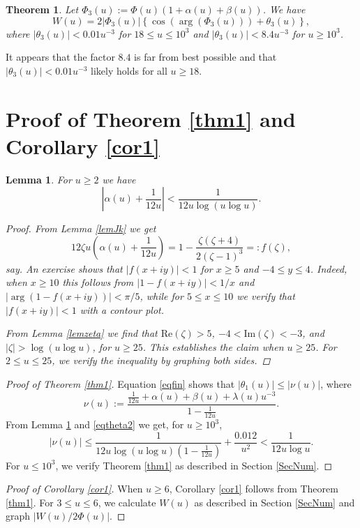 \documentclass[11pt]{amsart}
\newtheorem{theorem}{Theorem}
\newtheorem{lemma}{Lemma}
\begin{document}
\begin{theorem}\label{thm3}
Let $\Phi_3(u):=\Phi(u)(1+\alpha(u)+\beta(u))$. 
We have 
$$
W(u)=2 |\Phi_3(u)|\left\{\cos(\arg(\Phi_3(u)))+\theta_3(u)\right\},
$$
where $|\theta_3(u)|< 0.01 u^{-3}$ for $18 \le u \le 10^3$ and $|\theta_3(u)|<8.4 u^{-3}$ for $u\ge 10^3$.
\end{theorem}

It appears that the factor $8.4$ is far from best possible and that $|\theta_3(u)|< 0.01 u^{-3}$ likely holds for all $u\ge 18$. 



\section{Proof of Theorem \ref{thm1} and Corollary \ref{cor1}}



\begin{lemma}\label{lemalpha}
For $u\ge 2$ we have 
$$
\left| \alpha(u) +\frac{1}{12u}\right|< \frac{1}{12 u \log(u\log u)}.
$$
\begin{proof}
From Lemma \ref{lemJk} we get
$$
12 \zeta u\left(\alpha(u)+\frac{1}{12u}\right)=1-\frac{\zeta (\zeta+4)}{2 (\zeta-1)^3}=:f(\zeta),
$$
say. An exercise shows that $|f(x+iy)|<1$ for $x\ge 5$ and $-4 \le y \le 4$. 
Indeed, when $x\ge 10$ this follows from $|1-f(x+iy)|<1/x$ and $|\arg(1-f(x+iy))| < \pi/5$,
while for $5\le x \le 10$ we verify that $|f(x+iy)|<1$ with a contour plot.
 
From Lemma \ref{lemzeta} we find that
 $\mathrm{Re}(\zeta)>5$,
$-4<\mathrm{Im}(\zeta)<-3$, and 
$|\zeta|>\log(u\log u)$,  for $u\ge 25$. This establishes the claim when $u\ge 25$. 
For $2 \le u \le 25$, we verify the inequality by graphing both sides.
\end{proof}
\end{lemma}


\begin{proof}[Proof of Theorem \ref{thm1}]
Equation \eqref{eqfin} shows that $|\theta_1(u)|\le |\nu(u)|$, where
$$
\nu(u):=\frac{\frac{1}{12u}+\alpha(u) + \beta(u) +\lambda(u)u^{-3}}{1-\frac{1}{12u}}.
$$
From Lemma \ref{lemalpha} and \eqref{eqtheta2} we get, for $u\ge 10^3$,
$$
|\nu(u)| \le \frac{1}{12 u \log(u\log u)(1-\frac{1}{12u})}+\frac{0.012}{u^2}< \frac{1}{12 u \log u}.
$$
For $u\le 10^3$, we verify Theorem \ref{thm1} as described in Section \ref{SecNum}. 
\end{proof}

\begin{proof}[Proof of  Corollary \ref{cor1}]
When $u\ge 6$, Corollary \ref{cor1} follows from Theorem \ref{thm1}. 
For $3\le u \le 6$, we calculate $W(u)$ as described in Section \ref{SecNum} and graph $|W(u)/2\Phi(u)|$.
\end{proof}
\end{document}
